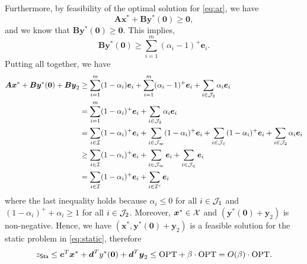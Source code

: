 \documentclass[moor]{informs1}              %
\newcommand{\opt}{\mathrm{OPT}}
\newcommand{\mb}[1]{\ensuremath{\boldsymbol{#1}}}
\begin{document}
{Furthermore, by feasibility of the optimal solution for \eqref{eq:ar}, we have
$$ \mb A \mb x^*+ \mb B \mb y^*(\mb 0) \geq \mb 0,$$
and  we know that $\mb B \mb y^*(\mb 0) \geq \mb 0$. This  implies,
$$ \mb B \mb y^*(\mb 0) \geq \sum_{ i=1}^m (\alpha_i -1)^+ \mb e_i.$$
Putting all together, we have
\begin{align*}
\mb A \mb x^* + \mb B\mb y^*(\mb 0)+ \mb B \mb y_2 &\geq \sum_{i=1}^m (1-\alpha_i) \mb e_i + \sum_{ i=1}^m (\alpha_i -1)^+ \mb e_i + \sum_{i \in {\cal J}_{2} } \alpha_i \mb e_i \\
&= \sum_{i=1}^m (1-\alpha_i)^+ \mb e_i  + \sum_{i \in {\cal J}_{2} } \alpha_i \mb e_i \\
&= \sum_{i \in {\cal I}}    (1-\alpha_i)^+ \mb e_i  +   \sum_{i \in {\cal J_1}}     (1-\alpha_i)^+ \mb e_i+   \sum_{i \in {\cal J_2}}    (1-\alpha_i)^+\mb e_i        +                 \sum_{i \in {\cal J}_{2} } \alpha_i \mb e_i \\
&\geq  \sum_{i \in {\cal I}}    (1-\alpha_i)^+ \mb e_i  +   \sum_{i \in {\cal J_1}}      \mb e_i+   \sum_{i \in {\cal J_2}}    \mb e_i \\
& =  \sum_{i \in {\cal I}}    (1-\alpha_i)^+ \mb e_i  +   \sum_{i \in {\cal I}^c}      \mb e_i
\end{align*}
where the last inequality holds because $ \alpha_i \leq 0 $ for all $ i \in {\cal J}_1$ and $   (1-\alpha_i)^+ + \alpha_i \geq 1$ for all $ i \in  {\cal J}_2$. Moreover, $\mb x^* \in {\cal X}$ and $(\mb y^*(\mb 0)+  \mb y_2)$ is non-negative.  Hence, we have $(\mb x^*, \mb y^*(\mb 0)+  \mb y_2         )$ is a feasible solution for the static problem in \eqref{eq:static}, therefore
$$ z_{\sf Sta} \leq     \mb c^T \mb x^* + \mb d^T  y^*(\mb 0)  + \mb d^T     \mb{y}_2  
 \leq   \opt+   \beta \cdot  \opt = O( \beta) \cdot \opt.$$
\hfill
\Halmos
\endproof
}
\end{document}
